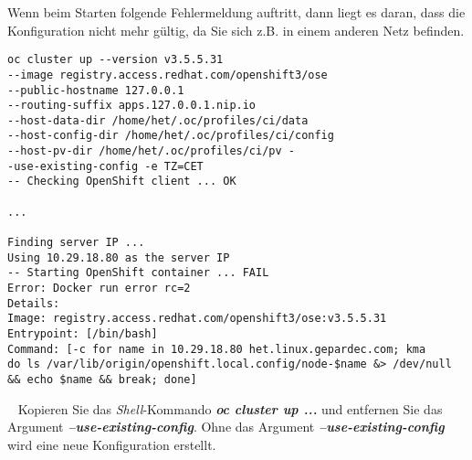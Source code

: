 Wenn beim Starten folgende Fehlermeldung auftritt, dann liegt es daran, dass die Konfiguration nicht mehr gültig, da Sie sich z.B. in einem anderen Netz befinden.
\begin{verbatim}
oc cluster up --version v3.5.5.31 
--image registry.access.redhat.com/openshift3/ose 
--public-hostname 127.0.0.1 
--routing-suffix apps.127.0.0.1.nip.io 
--host-data-dir /home/het/.oc/profiles/ci/data 
--host-config-dir /home/het/.oc/profiles/ci/config 
--host-pv-dir /home/het/.oc/profiles/ci/pv -
-use-existing-config -e TZ=CET                                                                                                 
-- Checking OpenShift client ... OK   

...

Finding server IP ... 
Using 10.29.18.80 as the server IP
-- Starting OpenShift container ... FAIL
Error: Docker run error rc=2
Details:
Image: registry.access.redhat.com/openshift3/ose:v3.5.5.31
Entrypoint: [/bin/bash]
Command: [-c for name in 10.29.18.80 het.linux.gepardec.com; kma
do ls /var/lib/origin/openshift.local.config/node-$name &> /dev/null 
&& echo $name && break; done]
\end{verbatim}
\ \newline
Kopieren Sie das \emph{Shell}-Kommando \textbf{\emph{oc cluster up ...}} und entfernen Sie das Argument \textbf{\emph{--use-existing-config}}. Ohne das Argument \textbf{\emph{--use-existing-config}} wird eine neue Konfiguration erstellt.


